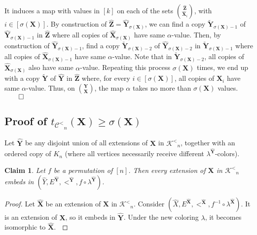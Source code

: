 \documentclass[reqno]{amsart}
\newtheorem{claimm}{Claim}
\begin{document}
It induces a map with values in $[k]$ on each of the sets $\binom{{\widehat{\textbf{{Z}}}}}{{\widehat{\textbf{{X}}}}_i}$, with $i \in [\sigma({\textbf{{X}}})]$. By construction of ${\widehat{\textbf{{Z}}}}={\widehat{\textbf{{Y}}}}_{\sigma({\textbf{{X}}})}$, we can find a copy ${\widetilde{\textbf{{Y}}}}_{\sigma({\textbf{{X}}})-1}$ of ${\widehat{\textbf{{Y}}}}_{\sigma({\textbf{{X}}})-1}$ in ${\widehat{\textbf{{Z}}}}$ where all copies of ${\widehat{\textbf{{X}}}}_{\sigma({\textbf{{X}}})}$ have same $\alpha$-value. Then, by construction of ${\widehat{\textbf{{Y}}}}_{\sigma({\textbf{{X}}})-1}$, find a copy ${\widetilde{\textbf{{Y}}}}_{\sigma({\textbf{{X}}})-2}$ of ${\widehat{\textbf{{Y}}}}_{\sigma({\textbf{{X}}})-2}$ in ${\widetilde{\textbf{{Y}}}}_{\sigma({\textbf{{X}}})-1}$ where all copies of ${\widehat{\textbf{{X}}}}_{\sigma({\textbf{{X}}})-1}$ have same $\alpha$-value. Note that in ${\widetilde{\textbf{{Y}}}}_{\sigma({\textbf{{X}}})-2}$, all copies of ${\widehat{\textbf{{X}}}}_{\sigma({\textbf{{X}}})}$ also have same $\alpha$-value. Repeating this process $\sigma({\textbf{{X}}})$ times, we end up with a copy ${\widetilde{\textbf{{Y}}}}$ of ${\widehat{\textbf{{Y}}}}$ in ${\widehat{\textbf{{Z}}}}$ where, for every $i \in [\sigma({\textbf{{X}}})]$, all copies of ${\widehat{\textbf{{X}}}}_i$ have same $\alpha$-value. Thus, on $\binom{{\textbf{{Y}}}}{{\textbf{{X}}}}$, the map $\alpha$ takes no more than $\sigma({\textbf{{X}}})$ values. $\qed$  

\subsection{Proof of $t_{{\mathcal{C}^<} _n}({\textbf{{X}}}) \geq \sigma({\textbf{{X}}})$}

\label{subsection:t>sigma}

Let ${\widehat{\textbf{{Y}}}}$ be any disjoint union of all extensions of ${\textbf{{X}}}$ in ${\mathcal{K}^<} _n$, together with an ordered copy of $K_n$ (where all vertices necessarily receive different $\lambda^{{\widehat{\textbf{{Y}}}}}$-colors). 

\begin{claimm}
\label{claim:Yeq}
Let $f$ be a permutation of $[n]$. Then every extension of ${\textbf{{X}}}$ in ${\mathcal{K}^<} _n$ embeds in $(\hat{Y}, E^{{\widehat{\textbf{{Y}}}}}, <^{{\widehat{\textbf{{Y}}}}}, f \circ \lambda^{{\widehat{\textbf{{Y}}}}})$. 
\end{claimm}

\begin{proof}
Let ${\widehat{\textbf{{X}}}}$ be an extension of ${\textbf{{X}}}$ in ${\mathcal{K}^<} _n$. Consider $(\hat{X}, E^{{\widehat{\textbf{{X}}}}}, <^{{\widehat{\textbf{{X}}}}}, f^{-1} \circ \lambda^{{\widehat{\textbf{{X}}}}})$. It is an extension of ${\textbf{{X}}}$, so it embeds in ${\widehat{\textbf{{Y}}}}$. Under the new coloring $\lambda$, it becomes isomorphic to ${\widehat{\textbf{{X}}}}$. $\qedhere$ \end{proof}
\end{document}

